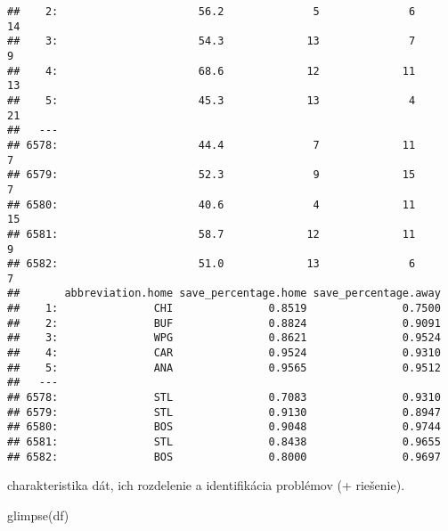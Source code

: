 \documentclass[
]{article}
\newenvironment{Shaded}{\begin{snugshade}}{\end{snugshade}}
\newcommand{\FunctionTok}[1]{\textcolor[rgb]{0.00,0.00,0.00}{#1}}
\newcommand{\NormalTok}[1]{#1}
\begin{document}
\begin{verbatim}
##    2:                      56.2              5              6           14
##    3:                      54.3             13              7            9
##    4:                      68.6             12             11           13
##    5:                      45.3             13              4           21
##   ---                                                                     
## 6578:                      44.4              7             11            7
## 6579:                      52.3              9             15            7
## 6580:                      40.6              4             11           15
## 6581:                      58.7             12             11            9
## 6582:                      51.0             13              6            7
##       abbreviation.home save_percentage.home save_percentage.away
##    1:               CHI               0.8519               0.7500
##    2:               BUF               0.8824               0.9091
##    3:               WPG               0.8621               0.9524
##    4:               CAR               0.9524               0.9310
##    5:               ANA               0.9565               0.9512
##   ---                                                            
## 6578:               STL               0.7083               0.9310
## 6579:               STL               0.9130               0.8947
## 6580:               BOS               0.9048               0.9744
## 6581:               STL               0.8438               0.9655
## 6582:               BOS               0.8000               0.9697
\end{verbatim}

charakteristika dát, ich rozdelenie a identifikácia problémov (+
riešenie).

\begin{Shaded}
\begin{Highlighting}[]
\FunctionTok{glimpse}\NormalTok{(df)}
\end{Highlighting}
\end{Shaded}
\end{document}
